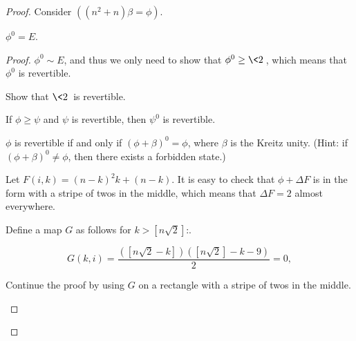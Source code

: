 \documentclass[11pt]{scrartcl}
\begin{document}
  \begin{proof}
    \hfill

    Consider $((n^{2} + n)\beta = \phi)$.

    \begin{lemma}
      $\phi^{0} = E$.
    \end{lemma}

    \begin{proof}
      \hfill

      $\phi^{0} \sim E$, and thus we only need to show that
      $\phi^{0} \geq \< 2 \>$, which means that $\phi^{0}$ is
      revertible.
      \begin{exercise}

        Show that $\< 2 \>$ is revertible.

      \end{exercise}
      \begin{exercise}

        If $\phi \geq \psi$ and $\psi$ is revertible, then $\psi^{0}$
        is revertible.

      \end{exercise}

      \begin{exercise}

        $\phi$ is revertible if and only if
        $(\phi+ \beta)^{0} = \phi$, where $\beta$ is the Kreitz unity.
        (Hint: if $(\phi + \beta)^{0} \neq \phi$, then there exists a
        forbidden state.)

      \end{exercise}

      Let $F(i, k) = (n-k)^{2}k + (n-k)$. It is easy to check that
      $\phi + \Delta F$ is in the form with a stripe of twos in the
      middle, which means that $\Delta F = 2$ almost everywhere.

      Define a map $G$ as follows for $k > [n \sqrt{2}]$:.
      
      \begin{equation*}
        G(k, i) = \frac{([n \sqrt{2} -k])([n \sqrt{2}] - k -9)}{2} = 0,
      \end{equation*}

      \begin{exercise}

        Continue the proof by using $G$ on a rectangle with a stripe of
        twos in the middle.

      \end{exercise}      
    \end{proof}

  \end{proof}

  
  
\end{document}
